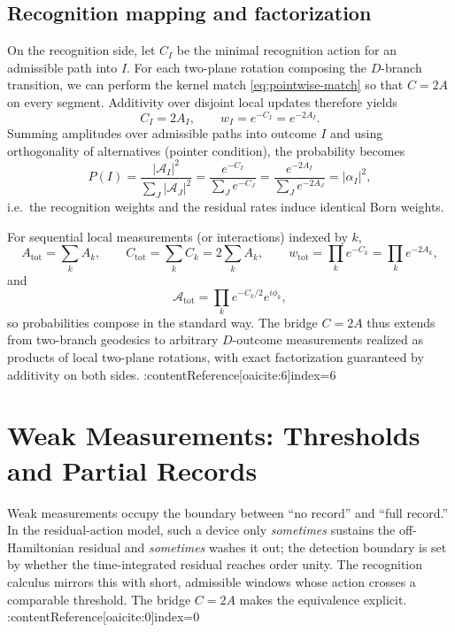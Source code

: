 \documentclass[11pt,letterpaper]{article}
\begin{document}
\subsection{Recognition mapping and factorization}

On the recognition side, let \(C_I\) be the minimal recognition action for an admissible path into \(I\). For each two-plane rotation composing the \(D\)-branch transition, we can perform the kernel match \eqref{eq:pointwise-match} so that \(C=2A\) on every segment. Additivity over disjoint local updates therefore yields
\begin{equation}
C_I=2A_I,
\qquad
w_I=e^{-C_I}=e^{-2A_I}.
\label{eq:CI-equals-2AI}
\end{equation}
Summing amplitudes over admissible paths into outcome \(I\) and using orthogonality of alternatives (pointer condition), the probability becomes
\begin{equation}
P(I)=\frac{|\mathcal A_I|^2}{\sum_J |\mathcal A_J|^2}
=\frac{e^{-C_I}}{\sum_J e^{-C_J}}
=\frac{e^{-2A_I}}{\sum_J e^{-2A_J}}
=|\alpha_I|^2,
\end{equation}
i.e.\ the recognition weights and the residual rates induce identical Born weights.

For sequential local measurements (or interactions) indexed by \(k\),
\begin{equation}
A_{\text{tot}}=\sum_k A_k,
\qquad
C_{\text{tot}}=\sum_k C_k=2\sum_k A_k,
\qquad
w_{\text{tot}}=\prod_k e^{-C_k}=\prod_k e^{-2A_k},
\end{equation}
and
\begin{equation}
\mathcal A_{\text{tot}}=\prod_k e^{-C_k/2}e^{i\phi_k},
\end{equation}
so probabilities compose in the standard way. The bridge \(C=2A\) thus extends from two-branch geodesics to arbitrary \(D\)-outcome measurements realized as products of local two-plane rotations, with exact factorization guaranteed by additivity on both sides. :contentReference[oaicite:6]{index=6}

\section{Weak Measurements: Thresholds and Partial Records}

Weak measurements occupy the boundary between ``no record'' and ``full record.'' In the residual-action model, such a device only \emph{sometimes} sustains the off-Hamiltonian residual and \emph{sometimes} washes it out; the detection boundary is set by whether the time-integrated residual reaches order unity. The recognition calculus mirrors this with short, admissible windows whose action crosses a comparable threshold. The bridge $C=2A$ makes the equivalence explicit. :contentReference[oaicite:0]{index=0}
\end{document}
